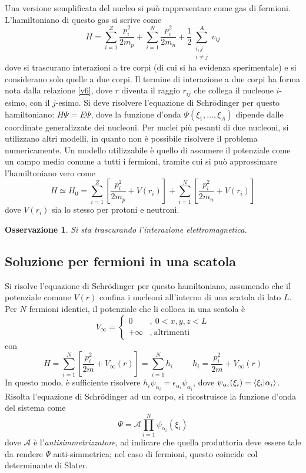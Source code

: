 \documentclass[11pt, a4paper]{scrartcl}
\theoremstyle{style}
\newtheorem{osservazione}{Osservazione}[section]
\numberwithin{equation}{subsection}
\begin{document}
Una versione semplificata del nucleo si pu\`o rappresentare come gas di fermioni.
L'hamiltoniano di questo gas si scrive come
\[
	H = \sum_{i=1}^{Z} \frac{p_i^2}{2m_p} + \sum_{i=1}^{N} \frac{p_i^2}{2m_n} + \frac{1}{2} \sum_{\substack{i,j \\ i \neq j}}^{A}  v_{ij}
\] 
dove si trascurano interazioni a tre corpi (di cui si ha evidenza sperimentale) e si considerano solo quelle a due corpi.
Il termine di interazione a due corpi ha forma nota dalla relazione \ref{v6}, dove $r$ diventa il raggio $r_{ij}$ che collega il nucleone $i$-esimo, con il $j$-esimo.
Si deve risolvere l'equazione di Schr\"odinger per questo hamiltoniano: $H \Psi  = E \Psi $, dove la funzione d'onda $\Psi (\xi _1, \ldots, \xi _A)$ dipende dalle coordinate generalizzate dei nucleoni.
Per nuclei pi\`u pesanti di due nucleoni, si utilizzano altri modelli, in quanto non \`e possibile risolvere il problema numericamente.
Un modello utilizzabile \`e quello di assumere il potenziale come un campo medio comune a tutti i fermioni, tramite cui si pu\`o approssimare l'hamiltoniano vero come
\[
H \simeq H_0 = \sum_{i=1}^{Z} \left[ \frac{p_i^2}{2m_p} + V(r_i) \right]  + \sum_{i=1}^{N} \left[ \frac{p_i^2}{2m_n} + V(r_i) \right] 
\] 
dove $V(r_i)$ sia lo stesso per protoni e neutroni. 
\begin{osservazione}
Si sta trascurando l'interazione elettromagnetica.
\end{osservazione}

\subsection{Soluzione per fermioni in una scatola}

Si risolve l'equazione di Schr\"odinger per questo hamiltoniano, assumendo che il potenziale comune $V(r)$ confina i nucleoni all'interno di una scatola di lato $L $.
Per $N$ fermioni identici, il potenziale che li colloca in una scatola \`e 
\[
V_\infty = \begin{cases}
	0 &,\ 0<x,y,z<L\\
	+\infty&,\ \text{altrimenti}
\end{cases}
\] 
con 
\[
H = \sum_{i=1}^{N}  \left[ \frac{p_i^2}{2m} + V_\infty(r) \right] = \sum_{i=1}^{N} h_i \hspace{1cm} h_i = \frac{p_i^2}{2m} + V_\infty(r) 
\] 
In questo modo, \`e sufficiente risolvere $h_i \psi _{\alpha _i} = \epsilon _{\alpha _i}\psi _{\alpha _i}$, dove $\psi _{\alpha _i}(\xi _i) = \braket{\xi _i|\alpha _i} $.
Risolta l'equazione di Schr\"odinger ad un corpo, si ricostruisce la funzione d'onda del sistema come
\[
\Psi  = \mathscr{A}  \prod_{i=1}^N \psi _{\alpha _i}(\xi _i)
\] 
dove $\mathscr{A} $ \`e l'\textit{antisimmetrizzatore}, ad indicare che quella produttoria deve essere tale da rendere $\Psi $ anti-simmetrica; nel caso di fermioni, questo coincide col determinante di Slater.
\end{document}
